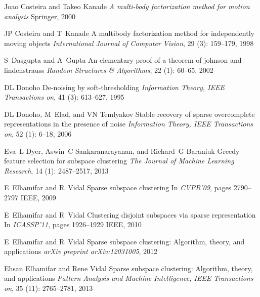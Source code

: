 \documentclass[12pt,heading]{ctexbook}
\begin{document}
\begin{thebibliography}{99}
    Joao Costeira and Takeo Kanade
    \newblock \emph{A multi-body factorization method for motion analysis}
    \newblock Springer, 2000

    JP Costeira and T~Kanade
    \newblock A multibody factorization method for independently moving objects
    \newblock \emph{International Journal of Computer Vision}, 29
    (3): 159--179, 1998

    S~Dasgupta and A~Gupta
    \newblock An elementary proof of a theorem of johnson and lindenstrauss
    \newblock \emph{Random Structures \& Algorithms}, 22 (1):
    60--65, 2002

    DL Donoho
    \newblock De-noising by soft-thresholding
    \newblock \emph{Information Theory, IEEE Transactions on}, 41
    (3): 613--627, 1995

    DL Donoho, M~Elad, and VN Temlyakov
    \newblock Stable recovery of sparse overcomplete representations in the
    presence of noise
    \newblock \emph{Information Theory, IEEE Transactions on}, 52
    (1): 6--18, 2006

    Eva~L Dyer, Aswin~C Sankaranarayanan, and Richard~G Baraniuk
    \newblock Greedy feature selection for subspace clustering
    \newblock \emph{The Journal of Machine Learning Research}, 14
    (1): 2487--2517, 2013

    E~Elhamifar and R~Vidal
    \newblock Sparse subspace clustering
    \newblock In \emph{CVPR'09}, pages 2790--2797 IEEE, 2009

    E~Elhamifar and R~Vidal
    \newblock Clustering disjoint subspaces via sparse representation
    \newblock In \emph{ICASSP'11}, pages 1926--1929 IEEE, 2010

    E~Elhamifar and R~Vidal
    \newblock Sparse subspace clustering: Algorithm, theory, and applications
    \newblock \emph{arXiv preprint arXiv:12031005}, 2012

    Ehsan Elhamifar and Rene Vidal
    \newblock Sparse subspace clustering: Algorithm, theory, and applications
    \newblock \emph{Pattern Analysis and Machine Intelligence, IEEE Transactions
    on}, 35 (11): 2765--2781, 2013


\end{thebibliography}
\end{document}
